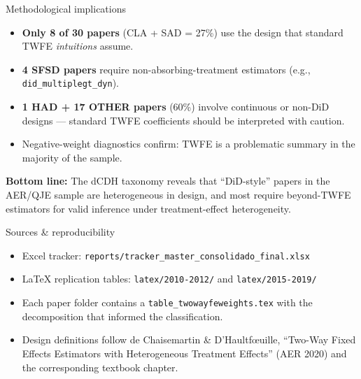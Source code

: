 \documentclass[10pt,aspectratio=169]{beamer}
\begin{document}
\begin{frame}{Methodological implications}
\begin{itemize}
  \item \textbf{Only 8 of 30 papers} (CLA + SAD = 27\%) use the design that standard TWFE \emph{intuitions} assume.
  \item \textbf{4 SFSD papers} require non-absorbing-treatment estimators (e.g., \texttt{did\_multiplegt\_dyn}).
  \item \textbf{1 HAD + 17 OTHER papers} (60\%) involve continuous or non-DiD designs --- standard TWFE coefficients should be interpreted with caution.
  \item Negative-weight diagnostics confirm: TWFE is a problematic summary in the majority of the sample.
\end{itemize}
\vfill
\textbf{Bottom line:} The dCDH taxonomy reveals that ``DiD-style'' papers in the AER/QJE sample are heterogeneous in design, and most require beyond-TWFE estimators for valid inference under treatment-effect heterogeneity.
\end{frame}

\begin{frame}{Sources \& reproducibility}
\begin{itemize}
  \item Excel tracker: \texttt{reports/tracker\_master\_consolidado\_final.xlsx}
  \item LaTeX replication tables: \texttt{latex/2010-2012/} and \texttt{latex/2015-2019/}
  \item Each paper folder contains a \texttt{table\_twowayfeweights.tex} with the decomposition that informed the classification.
  \item Design definitions follow de Chaisemartin \& D'Haultf\oe uille, ``Two-Way Fixed Effects Estimators with Heterogeneous Treatment Effects'' (AER 2020) and the corresponding textbook chapter.
\end{itemize}
\end{frame}
\end{document}
